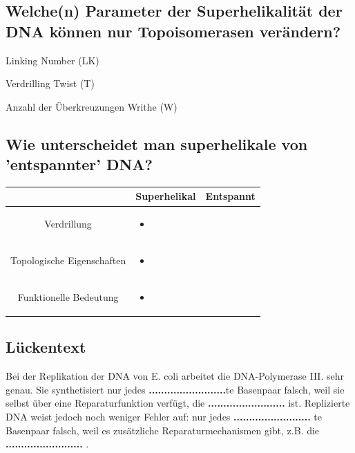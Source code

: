 \documentclass{article}
\begin{document}
\subsection*{Welche(n) Parameter der Superhelikalität der DNA können nur Topoisomerasen verändern?}
\begin{todolist}
\item  Linking Number (LK)
\item Verdrilling Twist (T) 
\item Anzahl der Überkreuzungen Writhe (W)
\end{todolist}
\subsection*{Wie unterscheidet man superhelikale von 'entspannter' DNA?}
\begin{table}[H]
    \centering
    \begin{tabular}{|c||p{5cm}|p{5cm}|} \hline 
         & Superhelikal & Entspannt  \\ \hline\hline
        Verdrillung & \begin{itemize}     \item  \end{itemize} & \\ \hline
        Topologische Eigenschaften&\begin{itemize}     \item  \end{itemize}& \\ \hline
        Funktionelle Bedeutung &\begin{itemize}     \item  \end{itemize}& \\ \hline
    \end{tabular}
    \label{tab:my_label}
\end{table} 
\subsection*{Lückentext}
Bei der Replikation der DNA von E. coli arbeitet die DNA-Polymerase III. sehr genau. Sie synthetisiert nur jedes \textbf{.........................}te Basenpaar falsch, weil sie selbst über eine Reparaturfunktion verfügt, die \textbf{.........................}  ist. \newline
Replizierte DNA weist jedoch noch weniger Fehler auf: nur jedes \textbf{.........................}  te Basenpaar falsch, weil es zusätzliche Reparaturmechanismen gibt, z.B. die \textbf{.........................} .
\end{document}
